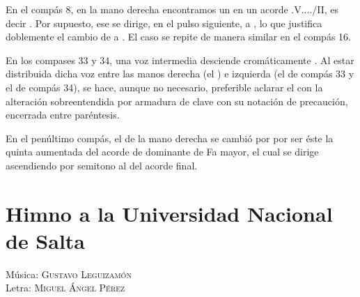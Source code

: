 En el compás 8, en la mano derecha encontramos un  en un acorde \acorde.V..../II, es decir \hbox{.} Por supuesto, ese  se dirige, en el pulso siguiente, a  \hbox{,} lo que justifica doblemente el cambio de  a . El caso se repite de manera similar en el compás 16.

En los compases 33 y 34, una voz intermedia desciende cromáticamente . Al estar distribuida dicha voz entre las manos derecha (el ) e izquierda (el  de compás 33 y el  de compás 34), se hace, aunque no necesario, preferible aclarar el  con la alteración sobreentendida por armadura de clave con su notación de precaución, encerrada entre paréntesis.

En el penúltimo compás, el  de la mano derecha se cambió por  por ser éste la quinta aumentada del acorde de dominante de Fa mayor, el cual se dirige ascendiendo por semitono al  del acorde final.


\newpage
\section{Himno a la Universidad Nacional de Salta}\label{partitura-digitalizada}

\begin{flushright}
Música: \textsc{Gustavo Leguizamón}\\
Letra: \textsc{Miguel Ángel Pérez}
\end{flushright}

